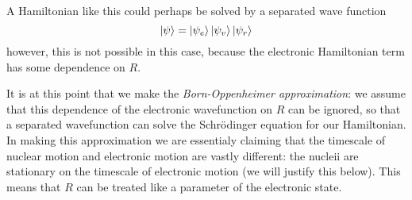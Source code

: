 A Hamiltonian like this could perhaps be solved by a separated wave function
\begin{equation}
  \ket{\psi} = \ket{\psi_e} \ket{\psi_v} \ket{\psi_r}
\end{equation}
however, this is not possible in this case, because the electronic Hamiltonian
term has some dependence on $R$. 

It is at this point that we make the \emph{Born-Oppenheimer approximation}: we
assume that this dependence of the electronic wavefunction on $R$ can be
ignored, so that a separated wavefunction can solve the Schr\"odinger equation
for our Hamiltonian. In making this approximation we are essentialy claiming
that the timescale of nuclear motion and electronic motion are vastly different:
the nucleii are stationary on the timescale of electronic motion (we will
justify this below). This means that $R$ can be treated like a parameter of the
electronic state.
